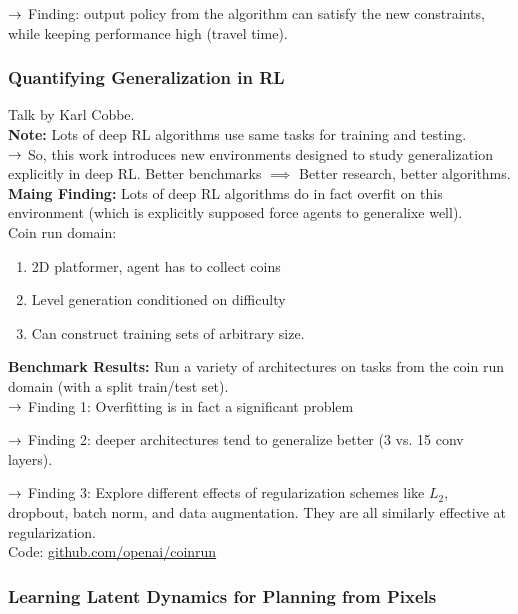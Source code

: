 $\rightarrow$ Finding: output policy from the algorithm can satisfy the new constraints, while keeping performance high (travel time).

\spacerule


\subsubsection{Quantifying Generalization in RL~\cite{cobbe2018quantifying}}

Talk by Karl Cobbe. \\

{\bf Note:} Lots of deep RL algorithms use same tasks for training and testing. \\

$\rightarrow$ So, this work introduces new environments designed to study generalization explicitly in deep RL. Better benchmarks $\implies$ Better research, better algorithms. \\

{\bf Maing Finding:} Lots of deep RL algorithms do in fact overfit on this environment (which is explicitly supposed force agents to generalixe well). \\

Coin run domain:
\begin{enumerate}
    \item 2D platformer, agent has to collect coins
    \item Level generation conditioned on difficulty
    \item Can construct training sets of arbitrary size.
\end{enumerate}

{\bf Benchmark Results:} Run a variety of architectures on tasks from the coin run domain (with a split train/test set). \\

$\rightarrow$ Finding 1: Overfitting is in fact a significant problem

$\rightarrow$ Finding 2: deeper architectures tend to generalize better (3 vs. 15 conv layers).

$\rightarrow$ Finding 3: Explore different effects of regularization schemes like $L_2$, dropbout, batch norm, and data augmentation. They are all similarly effective at regularization. \\

Code: \url{github.com/openai/coinrun}

\spacerule

\subsubsection{Learning Latent Dynamics for Planning from Pixels~\cite{hafner2018learning}}

